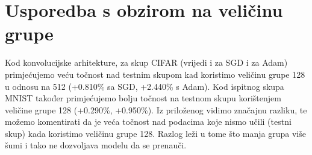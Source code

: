 \bigskip

\section{Usporedba s obzirom na veličinu grupe}

Kod konvolucijske arhitekture, za skup CIFAR (vrijedi i za SGD i za Adam) primjećujemo veću točnost nad testnim skupom kad koristimo veličinu grupe 128 u odnosu na 512 (+0.810\% sa SGD, +2.440\% s Adam). Kod ispitnog skupa MNIST također primjećujemo bolju točnost na testnom skupu korištenjem veličine grupe 128 (+0.290\%, +0.950\%). Iz priloženog vidimo značajnu razliku, te možemo komentirati da je veća točnost nad podacima koje nismo učili (testni skup) kada koristimo veličinu grupe 128. Razlog leži u tome što manja grupa više šumi i tako ne dozvoljava modelu da se prenauči.